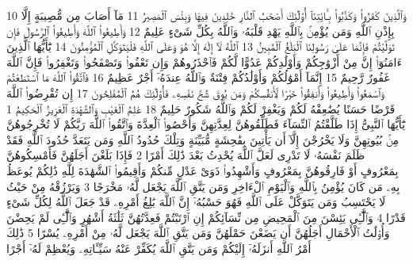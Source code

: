 {\tiny\colorbox{cl_aya}{10}} وَٱلَّذِينَ كَفَرُوا۟ وَكَذَّبُوا۟ بِـَٔايَٰتِنَآ أُو۟لَٰٓئِكَ أَصْحَٰبُ ٱلنَّارِ خَٰلِدِينَ فِيهَا وَبِئْسَ ٱلْمَصِيرُ
{\tiny\colorbox{cl_aya}{11}} مَآ أَصَابَ مِن مُّصِيبَةٍ إِلَّا بِإِذْنِ ٱللَّهِ وَمَن يُؤْمِنۢ بِٱللَّهِ يَهْدِ قَلْبَهُۥ وَٱللَّهُ بِكُلِّ شَىْءٍ عَلِيمٌ
{\tiny\colorbox{cl_aya}{12}} وَأَطِيعُوا۟ ٱللَّهَ وَأَطِيعُوا۟ ٱلرَّسُولَ فَإِن تَوَلَّيْتُمْ فَإِنَّمَا عَلَىٰ رَسُولِنَا ٱلْبَلَٰغُ ٱلْمُبِينُ
{\tiny\colorbox{cl_aya}{13}} ٱللَّهُ لَآ إِلَٰهَ إِلَّا هُوَ وَعَلَى ٱللَّهِ فَلْيَتَوَكَّلِ ٱلْمُؤْمِنُونَ
{\tiny\colorbox{cl_aya}{14}} يَٰٓأَيُّهَا ٱلَّذِينَ ءَامَنُوٓا۟ إِنَّ مِنْ أَزْوَٰجِكُمْ وَأَوْلَٰدِكُمْ عَدُوًّا لَّكُمْ فَٱحْذَرُوهُمْ وَإِن تَعْفُوا۟ وَتَصْفَحُوا۟ وَتَغْفِرُوا۟ فَإِنَّ ٱللَّهَ غَفُورٌ رَّحِيمٌ
{\tiny\colorbox{cl_aya}{15}} إِنَّمَآ أَمْوَٰلُكُمْ وَأَوْلَٰدُكُمْ فِتْنَةٌ وَٱللَّهُ عِندَهُۥٓ أَجْرٌ عَظِيمٌ
{\tiny\colorbox{cl_aya}{16}} فَٱتَّقُوا۟ ٱللَّهَ مَا ٱسْتَطَعْتُمْ وَٱسْمَعُوا۟ وَأَطِيعُوا۟ وَأَنفِقُوا۟ خَيْرًا لِّأَنفُسِكُمْ وَمَن يُوقَ شُحَّ نَفْسِهِۦ فَأُو۟لَٰٓئِكَ هُمُ ٱلْمُفْلِحُونَ
{\tiny\colorbox{cl_aya}{17}} إِن تُقْرِضُوا۟ ٱللَّهَ قَرْضًا حَسَنًا يُضَٰعِفْهُ لَكُمْ وَيَغْفِرْ لَكُمْ وَٱللَّهُ شَكُورٌ حَلِيمٌ
{\tiny\colorbox{cl_aya}{18}} عَٰلِمُ ٱلْغَيْبِ وَٱلشَّهَٰدَةِ ٱلْعَزِيزُ ٱلْحَكِيمُ
{\tiny\colorbox{cl_aya}{1}} يَٰٓأَيُّهَا ٱلنَّبِىُّ إِذَا طَلَّقْتُمُ ٱلنِّسَآءَ فَطَلِّقُوهُنَّ لِعِدَّتِهِنَّ وَأَحْصُوا۟ ٱلْعِدَّةَ وَٱتَّقُوا۟ ٱللَّهَ رَبَّكُمْ لَا تُخْرِجُوهُنَّ مِنۢ بُيُوتِهِنَّ وَلَا يَخْرُجْنَ إِلَّآ أَن يَأْتِينَ بِفَٰحِشَةٍ مُّبَيِّنَةٍ وَتِلْكَ حُدُودُ ٱللَّهِ وَمَن يَتَعَدَّ حُدُودَ ٱللَّهِ فَقَدْ ظَلَمَ نَفْسَهُۥ لَا تَدْرِى لَعَلَّ ٱللَّهَ يُحْدِثُ بَعْدَ ذَٰلِكَ أَمْرًا
{\tiny\colorbox{cl_aya}{2}} فَإِذَا بَلَغْنَ أَجَلَهُنَّ فَأَمْسِكُوهُنَّ بِمَعْرُوفٍ أَوْ فَارِقُوهُنَّ بِمَعْرُوفٍ وَأَشْهِدُوا۟ ذَوَىْ عَدْلٍ مِّنكُمْ وَأَقِيمُوا۟ ٱلشَّهَٰدَةَ لِلَّهِ ذَٰلِكُمْ يُوعَظُ بِهِۦ مَن كَانَ يُؤْمِنُ بِٱللَّهِ وَٱلْيَوْمِ ٱلْءَاخِرِ وَمَن يَتَّقِ ٱللَّهَ يَجْعَل لَّهُۥ مَخْرَجًا
{\tiny\colorbox{cl_aya}{3}} وَيَرْزُقْهُ مِنْ حَيْثُ لَا يَحْتَسِبُ وَمَن يَتَوَكَّلْ عَلَى ٱللَّهِ فَهُوَ حَسْبُهُۥٓ إِنَّ ٱللَّهَ بَٰلِغُ أَمْرِهِۦ قَدْ جَعَلَ ٱللَّهُ لِكُلِّ شَىْءٍ قَدْرًا
{\tiny\colorbox{cl_aya}{4}} وَٱلَّٰٓـِٔى يَئِسْنَ مِنَ ٱلْمَحِيضِ مِن نِّسَآئِكُمْ إِنِ ٱرْتَبْتُمْ فَعِدَّتُهُنَّ ثَلَٰثَةُ أَشْهُرٍ وَٱلَّٰٓـِٔى لَمْ يَحِضْنَ وَأُو۟لَٰتُ ٱلْأَحْمَالِ أَجَلُهُنَّ أَن يَضَعْنَ حَمْلَهُنَّ وَمَن يَتَّقِ ٱللَّهَ يَجْعَل لَّهُۥ مِنْ أَمْرِهِۦ يُسْرًا
{\tiny\colorbox{cl_aya}{5}} ذَٰلِكَ أَمْرُ ٱللَّهِ أَنزَلَهُۥٓ إِلَيْكُمْ وَمَن يَتَّقِ ٱللَّهَ يُكَفِّرْ عَنْهُ سَيِّـَٔاتِهِۦ وَيُعْظِمْ لَهُۥٓ أَجْرًا
